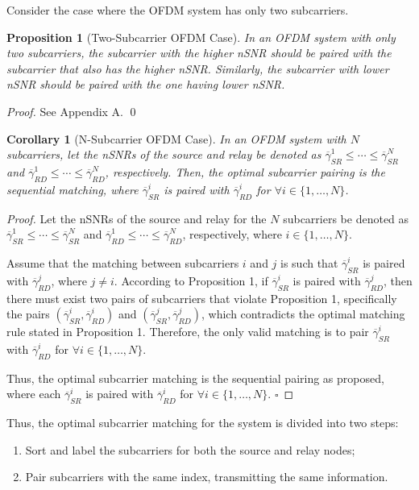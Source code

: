 \documentclass[lettersize,journal]{IEEEtran}
\newtheorem{corollary}{Corollary}
\newtheorem{proposition}{Proposition}
\begin{document}
	Consider the case where the OFDM system has only two subcarriers.
	
	\begin{proposition}[Two-Subcarrier OFDM Case]
	\label{prop:main}
		In an OFDM system with only two subcarriers, the subcarrier with the higher nSNR should be paired with the subcarrier that also has the higher nSNR. Similarly, the subcarrier with lower nSNR should be paired with the one having lower nSNR.
	\end{proposition}
	
	\begin{proof}
		See Appendix A. \qed
	\end{proof}
	\begin{corollary}[N-Subcarrier OFDM Case]
		In an OFDM system with \( N \) subcarriers, let the nSNRs of the source and relay be denoted as \( \overline{\gamma}_{SR}^{1} \leq \cdots \leq \overline{\gamma}_{SR}^{N} \) and \( \overline{\gamma}_{RD}^{1} \leq \cdots \leq \overline{\gamma}_{RD}^{N} \), respectively. Then, the optimal subcarrier pairing is the sequential matching, where \( \overline{\gamma}_{SR}^{i} \) is paired with \( \overline{\gamma}_{RD}^{i} \) for \( \forall i \in \{1, \dots, N\} \).
		\label{corollary:2}
	\end{corollary}
	
	\begin{proof}
		Let the nSNRs of the source and relay for the \( N \) subcarriers be denoted as \( \overline{\gamma}_{SR}^{1} \leq \cdots \leq \overline{\gamma}_{SR}^{N} \) and \( \overline{\gamma}_{RD}^{1} \leq \cdots \leq \overline{\gamma}_{RD}^{N} \), respectively, where \( i \in \{1, \dots, N\} \).
		
		Assume that the matching between subcarriers \( i \) and \( j \) is such that \( \overline{\gamma}_{SR}^{i} \) is paired with \( \overline{\gamma}_{RD}^{j} \), where \( j \neq i \). According to Proposition 1, if \( \overline{\gamma}_{SR}^{i} \) is paired with \( \overline{\gamma}_{RD}^{j} \), then there must exist two pairs of subcarriers that violate Proposition 1, specifically the pairs \( (\overline{\gamma}_{SR}^{i}, \overline{\gamma}_{RD}^{i}) \) and \( (\overline{\gamma}_{SR}^{j}, \overline{\gamma}_{RD}^{j}) \), which contradicts the optimal matching rule stated in Proposition 1. Therefore, the only valid matching is to pair \( \overline{\gamma}_{SR}^{i} \) with \( \overline{\gamma}_{RD}^{i} \) for \( \forall i \in \{1, \dots, N\} \).
		
		Thus, the optimal subcarrier matching is the sequential pairing as proposed, where each \( \overline{\gamma}_{SR}^{i} \) is paired with \( \overline{\gamma}_{RD}^{i} \) for \( \forall i \in \{1, \dots, N\} \).
		\(\square\)
	\end{proof}
	Thus, the optimal subcarrier matching for the system is divided into two steps:
	\begin{enumerate}
		\item Sort and label the subcarriers for both the source and relay nodes;
		\item Pair subcarriers with the same index, transmitting the same information.
	\end{enumerate}
	
\end{document}
